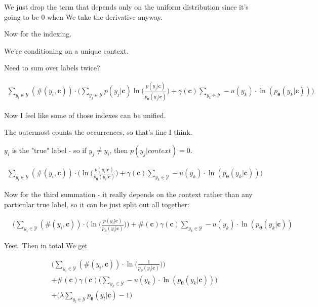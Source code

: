 \documentclass{article}
\newcommand{\vtheta}{\boldsymbol{\theta}}
\newcommand{\model}{p_{\vtheta}}
\newcommand{\context}{\boldsymbol{c}}
\begin{document}
			We just drop the term that depends only on the uniform distribution since it's going to be 0 when We take the derivative anyway.
			
			Now for the indexing. 
			
			We're conditioning on a unique context.
			
			Need to sum over labels twice?
			
			\begin{align}
				\sum_{y_i\in\mathcal{Y}} (\#(y_i, \context))\cdot \bigg( \sum_{y_j\in\mathcal{Y}} p(y_j|\context)\ln\bigg(\frac{p(y_j|\context)}{\model(y_j|\context)} \bigg) + \gamma(\context)\sum_{y_k\in\mathcal{Y}} - u(y_k)\cdot\ln(\model(y_k|\context)) \bigg)
			\end{align}	
			
			Now I feel like some of those indexes can be unified.
			
			The outermost counts the occurrences, so that's fine I think.
			
			$y_i$ is the "true" label - so if $y_j\neq y_i$, then $p(y_j|context) = 0$. 
			
			\begin{align}
				\sum_{y_i\in\mathcal{Y}} (\#(y_i, \context))\cdot \bigg(  \ln\bigg(\frac{p(y_i|\context)}{\model(y_i|\context)} \bigg) + \gamma(\context)\sum_{y_k\in\mathcal{Y}} - u(y_k)\cdot\ln(\model(y_k|\context)) \bigg)
			\end{align}		
				
			Now for the third summation - it really depends on the context rather than any particular true label, so it can be just split out all together:
			
			\begin{align}
				&\bigg(\sum_{y_i\in\mathcal{Y}} (\#(y_i, \context))\cdot \bigg( \ln\bigg(\frac{p(y_i|\context)}{\model(y_i|\context)} \bigg)\bigg) + \#(\context)\gamma(\context)\sum_{y_k\in\mathcal{Y}} - u(y_k)\cdot\ln(\model(y_k|\context)) 
			\end{align}	
			
			Yeet. Then in total We get 
			
			\begin{align}
				&\bigg(\sum_{y_i\in\mathcal{Y}} (\#(y_i, \context))\cdot  \ln\bigg(\frac{1}{\model(y_i|\context)} 	\bigg)\bigg) \\
				&+ \#(\context)\gamma(\context)\bigg(\sum_{y_k\in\mathcal{Y}} - u(y_k)\cdot\ln(\model(y_k|\context))\bigg) \\
				&+ \bigg(\lambda\sum_{y_l\in\mathcal{Y}} \model(y_l|\context) -1\bigg) 
			\end{align}	
			
\end{document}
